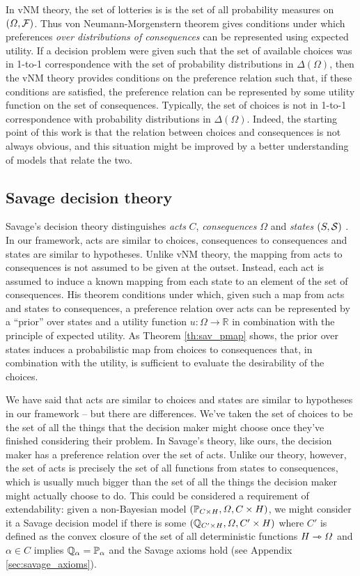 In vNM theory, the set of lotteries is is the set of all probability measures on $(\Omega,\mathcal{F})$. Thus von Neumann-Morgenstern theorem gives conditions under which preferences \emph{over distributions of consequences} can be represented using expected utility. If a decision problem were given such that the set of available choices was in 1-to-1 correspondence with the set of probability distributions in $\Delta(\Omega)$, then the vNM theory provides conditions on the preference relation such that, if these conditions are satisfied, the preference relation can be represented by some utility function on the set of consequences. Typically, the set of choices is not in 1-to-1 correspondence with probability distributions in $\Delta(\Omega)$. Indeed, the starting point of this work is that the relation between choices and consequences is not always obvious, and this situation might be improved by a better understanding of models that relate the two.

\subsection{Savage decision theory}

Savage's decision theory distinguishes \emph{acts} $C$, \emph{consequences} $\Omega$ and \emph{states} $(S,\mathcal{S})$ \citep{savage_foundations_1954}. In our framework, acts are similar to choices, consequences to consequences and states are similar to hypotheses. Unlike vNM theory, the mapping from acts to consequences is not assumed to be given at the outset. Instead, each act is assumed to induce a known mapping from each state to an element of the set of consequences. His theorem conditions under which, given such a map from acts and states to consequences, a preference relation over acts can be represented by a ``prior'' over states and a utility function $u:\Omega\to \mathbb{R}$ in combination with the principle of expected utility. As Theorem \ref{th:sav_pmap} shows, the prior over states induces a probabilistic map from choices to consequences that, in combination with the utility, is sufficient to evaluate the desirability of the choices.

We have said that acts are similar to choices and states are similar to hypotheses in our framework -- but there are differences. We've taken the set of choices to be the set of all the things that the decision maker might choose once they've finished considering their problem. In Savage's theory, like ours, the decision maker has a preference relation over the set of acts. Unlike our theory, however, the set of acts is precisely the set of all functions from states to consequences, which is usually much bigger than the set of all the things the decision maker might actually choose to do. This could be considered a requirement of extendability: given a non-Bayesian model $(\mathbb{P}_{C\times H},\Omega,C\times H)$, we might consider it a Savage decision model if there is some $(\mathbb{Q}_{C'\times H},\Omega,C'\times H)$ where $C'$ is defined as the convex closure of the set of all deterministic functions $H\rightarrowtriangle \Omega$ and $\alpha\in C$ implies $\mathbb{Q}_\alpha = \mathbb{P}_\alpha$ and the Savage axioms hold (see Appendix \ref{sec:savage_axioms}). 

